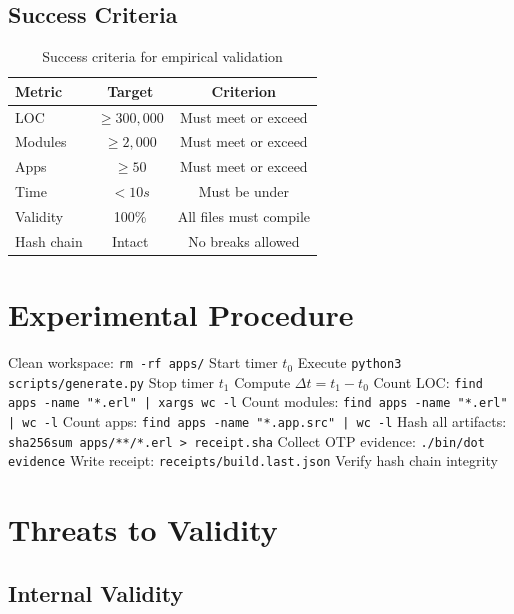 \subsection{Success Criteria}

\begin{table}[h]
\centering
\begin{tabular}{lcc}
\toprule
\textbf{Metric} & \textbf{Target} & \textbf{Criterion} \\
\midrule
LOC & $\geq 300,000$ & Must meet or exceed \\
Modules & $\geq 2,000$ & Must meet or exceed \\
Apps & $\geq 50$ & Must meet or exceed \\
Time & $< 10s$ & Must be under \\
Validity & 100\% & All files must compile \\
Hash chain & Intact & No breaks allowed \\
\bottomrule
\end{tabular}
\caption{Success criteria for empirical validation}
\label{tab:criteria}
\end{table}

\section{Experimental Procedure}

\begin{algorithm}
\caption{Manufacturing Experiment Procedure}
\begin{algorithmic}[1]
\STATE Clean workspace: \texttt{rm -rf apps/}
\STATE Start timer $t_0$
\STATE Execute \texttt{python3 scripts/generate.py}
\STATE Stop timer $t_1$
\STATE Compute $\Delta t = t_1 - t_0$
\STATE Count LOC: \texttt{find apps -name "*.erl" | xargs wc -l}
\STATE Count modules: \texttt{find apps -name "*.erl" | wc -l}
\STATE Count apps: \texttt{find apps -name "*.app.src" | wc -l}
\STATE Hash all artifacts: \texttt{sha256sum apps/**/*.erl > receipt.sha}
\STATE Collect OTP evidence: \texttt{./bin/dot evidence}
\STATE Write receipt: \texttt{receipts/build.last.json}
\STATE Verify hash chain integrity
\end{algorithmic}
\end{algorithm}

\section{Threats to Validity}

\subsection{Internal Validity}

